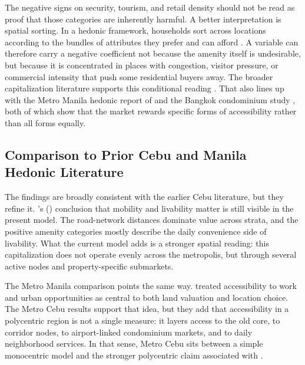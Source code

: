The negative signs on security, tourism, and retail density should not be read as proof that those categories are inherently harmful. A better interpretation is spatial sorting. In a hedonic framework, households sort across locations according to the bundles of attributes they prefer and can afford \parencite{tiebout1956,bayer2012tiebout}. A variable can therefore carry a negative coefficient not because the amenity itself is undesirable, but because it is concentrated in places with congestion, visitor pressure, or commercial intensity that push some residential buyers away. The broader capitalization literature supports this conditional reading \parencite{dronyk2017goldilocks,brasington2024fire,yang2016externality,song2004mixed,chenjim2010}. That also lines up with the Metro Manila hedonic report of \textcite{tiglaorivera2006} and the Bangkok condominium study \parencite{tochaiwat2023thai}, both of which show that the market rewards specific forms of accessibility rather than all forms equally.

\subsection{Comparison to Prior Cebu and Manila Hedonic Literature}\label{comparison-to-prior-cebu-and-manila-hedonic-literature}

The findings are broadly consistent with the earlier Cebu literature, but they refine it. \citeauthor{agosto2020}'s (\citeyear{agosto2020}) conclusion that mobility and livability matter is still visible in the present model. The road-network distances dominate value across strata, and the positive amenity categories mostly describe the daily convenience side of livability. What the current model adds is a stronger spatial reading: this capitalization does not operate evenly across the metropolis, but through several active nodes and property-specific submarkets.

The Metro Manila comparison points the same way. \textcite{tiglaorivera2006} treated accessibility to work and urban opportunities as central to both land valuation and location choice. The Metro Cebu results support that idea, but they add that accessibility in a polycentric region is not a single measure: it layers access to the old core, to corridor nodes, to airport-linked condominium markets, and to daily neighborhood services. In that sense, Metro Cebu sits between a simple monocentric model and the stronger polycentric claim associated with \textcite{heikkila1989cbd}.

